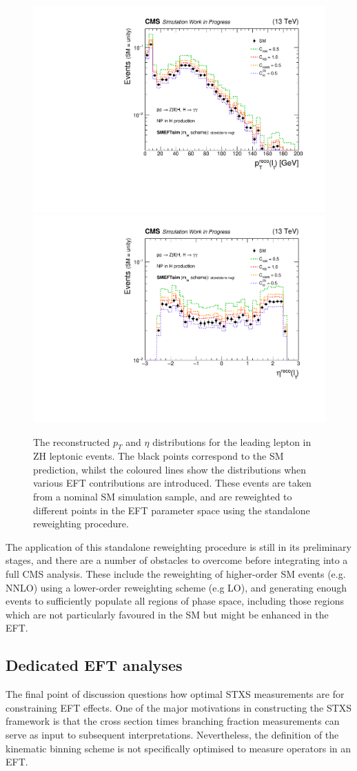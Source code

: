 \begin{figure}[htb!]
  \centering
  \includegraphics[width=.49\textwidth]{Figures/eft/distributions/lep_pt_nanoaod.pdf}
  \includegraphics[width=.49\textwidth]{Figures/eft/distributions/lep_eta_nanoaod.pdf}
  \caption[Standalone reweighting of ZH leptonic events]
  {
    The reconstructed $p_T$ and $\eta$ distributions for the leading lepton in ZH leptonic events. The black points correspond to the SM prediction, whilst the coloured lines show the distributions when various EFT contributions are introduced. These events are taken from a nominal SM simulation sample, and are reweighted to different points in the EFT parameter space using the standalone reweighting procedure.
  }
  \label{fig:standalone_rwgt}
\end{figure}

The application of this standalone reweighting procedure is still in its preliminary stages, and there are a number of obstacles to overcome before integrating into a full CMS analysis. These include the reweighting of higher-order SM events (e.g. NNLO) using a lower-order reweighting scheme (e.g LO), and generating enough events to sufficiently populate all regions of phase space, including those regions which are not particularly favoured in the SM but might be enhanced in the EFT.

\subsection{Dedicated EFT analyses}
The final point of discussion questions how optimal STXS measurements are for constraining EFT effects. One of the major motivations in constructing the STXS framework is that the cross section times branching fraction measurements can serve as input to subsequent interpretations. Nevertheless, the definition of the kinematic binning scheme is not specifically optimised to measure operators in an EFT. 

